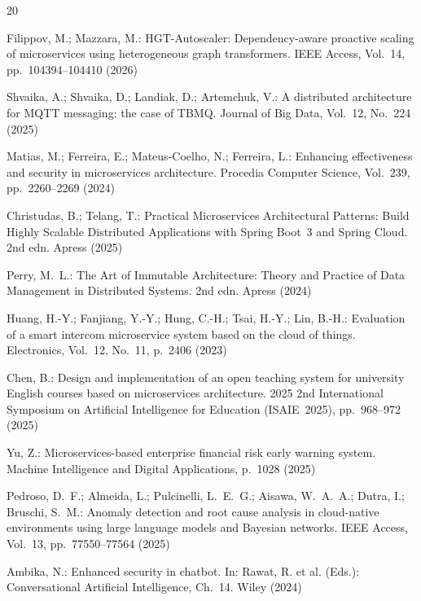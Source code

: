 \begin{thebibliography}{20}

 Filippov, M.; Mazzara, M.: HGT-Autoscaler: Dependency-aware proactive scaling of microservices using heterogeneous graph transformers. IEEE Access, Vol.~14, pp.~104394--104410 (2026)

 Shvaika, A.; Shvaika, D.; Landiak, D.; Artemchuk, V.: A distributed architecture for MQTT messaging: the case of TBMQ. Journal of Big Data, Vol.~12, No.~224 (2025)

 Matias, M.; Ferreira, E.; Mateus-Coelho, N.; Ferreira, L.: Enhancing effectiveness and security in microservices architecture. Procedia Computer Science, Vol.~239, pp.~2260--2269 (2024)

 Christudas, B.; Telang, T.: Practical Microservices Architectural Patterns: Build Highly Scalable Distributed Applications with Spring Boot~3 and Spring Cloud. 2nd edn. Apress (2025)

 Perry, M.~L.: The Art of Immutable Architecture: Theory and Practice of Data Management in Distributed Systems. 2nd edn. Apress (2024)

 Huang, H.-Y.; Fanjiang, Y.-Y.; Hung, C.-H.; Tsai, H.-Y.; Lin, B.-H.: Evaluation of a smart intercom microservice system based on the cloud of things. Electronics, Vol.~12, No.~11, p.~2406 (2023)

 Chen, B.: Design and implementation of an open teaching system for university English courses based on microservices architecture. 2025 2nd International Symposium on Artificial Intelligence for Education (ISAIE~2025), pp.~968--972 (2025)

 Yu, Z.: Microservices-based enterprise financial risk early warning system. Machine Intelligence and Digital Applications, p.~1028 (2025)

 Pedroso, D.~F.; Almeida, L.; Pulcinelli, L.~E.~G.; Aisawa, W.~A.~A.; Dutra, I.; Bruschi, S.~M.: Anomaly detection and root cause analysis in cloud-native environments using large language models and Bayesian networks. IEEE Access, Vol.~13, pp.~77550--77564 (2025)

 Ambika, N.: Enhanced security in chatbot. In: Rawat, R. et al. (Eds.): Conversational Artificial Intelligence, Ch.~14. Wiley (2024)


\end{thebibliography}
